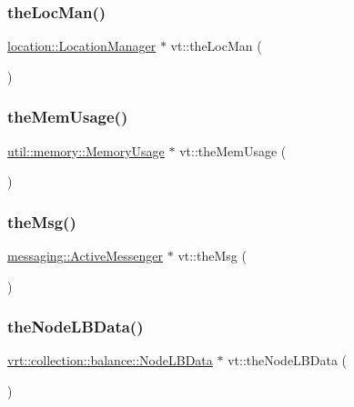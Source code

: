\mbox{\label{namespacevt_ace1c9d64e09732e3b7414d02517ecfdb}} 
\subsubsection{\texorpdfstring{the\+Loc\+Man()}{theLocMan()}}
{\footnotesize\ttfamily \hyperlink{structvt_1_1location_1_1_location_manager}{location\+::\+Location\+Manager} $\ast$ vt\+::the\+Loc\+Man (\begin{DoxyParamCaption}{ }\end{DoxyParamCaption})}

\mbox{\label{namespacevt_a38d485d3cf840b9a623e47e7754ef72e}} 
\subsubsection{\texorpdfstring{the\+Mem\+Usage()}{theMemUsage()}}
{\footnotesize\ttfamily \hyperlink{structvt_1_1util_1_1memory_1_1_memory_usage}{util\+::memory\+::\+Memory\+Usage} $\ast$ vt\+::the\+Mem\+Usage (\begin{DoxyParamCaption}{ }\end{DoxyParamCaption})}

\mbox{\label{namespacevt_aeafd31f866aeb4dc6fc2f6ee97136350}} 
\subsubsection{\texorpdfstring{the\+Msg()}{theMsg()}}
{\footnotesize\ttfamily \hyperlink{structvt_1_1messaging_1_1_active_messenger}{messaging\+::\+Active\+Messenger} $\ast$ vt\+::the\+Msg (\begin{DoxyParamCaption}{ }\end{DoxyParamCaption})}

\mbox{\label{namespacevt_af2ddfbdc455e98a0d46732522d8cf589}} 
\subsubsection{\texorpdfstring{the\+Node\+L\+B\+Data()}{theNodeLBData()}}
{\footnotesize\ttfamily \hyperlink{structvt_1_1vrt_1_1collection_1_1balance_1_1_node_l_b_data}{vrt\+::collection\+::balance\+::\+Node\+L\+B\+Data} $\ast$ vt\+::the\+Node\+L\+B\+Data (\begin{DoxyParamCaption}{ }\end{DoxyParamCaption})}

